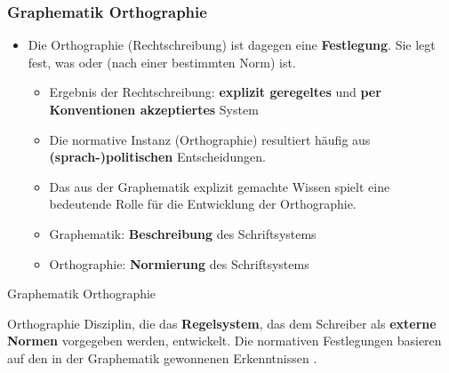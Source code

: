 \begin{frame}
\frametitle{Graphematik \vs Orthographie}

\begin{itemize}
	\item Die Orthographie (Rechtschreibung) ist dagegen eine \textbf{ Festlegung}. Sie legt fest, was \textbf{} oder \textbf{} (nach einer bestimmten Norm) ist.
	
	\begin{itemize}
		\item Ergebnis der Rechtschreibung: \textbf{explizit geregeltes} und \textbf{per Konventionen akzeptiertes} System
		
		\item Die normative Instanz (Orthographie) resultiert häufig aus \textbf{(sprach-)politischen} Entscheidungen.
		
		\item Das aus der Graphematik explizit gemachte Wissen spielt eine bedeutende Rolle für die Entwicklung der Orthographie.

\pause
		
		\item Graphematik: \textbf{Beschreibung} des Schriftsystems
		
		\item Orthographie: \textbf{Normierung} des Schriftsystems
	\end{itemize}
\end{itemize}

\end{frame}


\begin{frame}{Graphematik \vs Orthographie}

\begin{block}{Orthographie}
	Disziplin, die das \textbf{Regelsystem}, das dem Schreiber als \textbf{externe Normen} vorgegeben werden, entwickelt. Die normativen Festlegungen basieren \idR auf den in der Graphematik gewonnenen Erkenntnissen \citep[vgl.][141]{Duerscheid04a}.
\end{block}

\end{frame}


